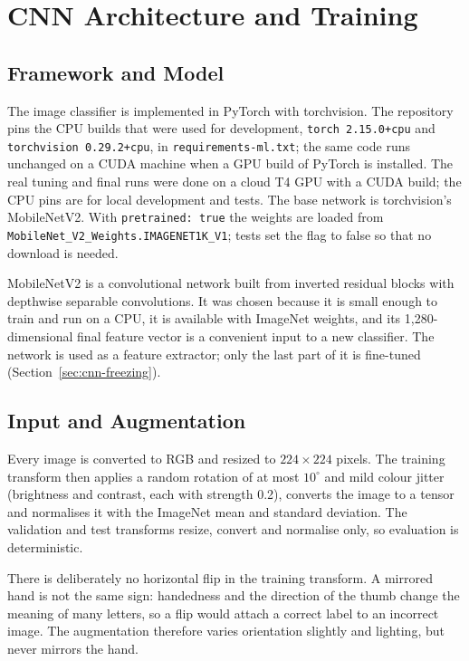 \section{CNN Architecture and Training}
\label{sec:cnn}

\subsection{Framework and Model}

The image classifier is implemented in PyTorch with torchvision. The repository pins the CPU builds that were used for development, \texttt{torch 2.15.0+cpu} and \texttt{torchvision 0.29.2+cpu}, in \texttt{requirements-ml.txt}; the same code runs unchanged on a CUDA machine when a GPU build of PyTorch is installed. The real tuning and final runs were done on a cloud T4 GPU with a CUDA build; the CPU pins are for local development and tests. The base network is torchvision's MobileNetV2. With \texttt{pretrained: true} the weights are loaded from \texttt{MobileNet\_V2\_Weights.IMAGENET1K\_V1}; tests set the flag to false so that no download is needed.

MobileNetV2 is a convolutional network built from inverted residual blocks with depthwise separable convolutions. It was chosen because it is small enough to train and run on a CPU, it is available with ImageNet weights, and its 1{,}280-dimensional final feature vector is a convenient input to a new classifier. The network is used as a feature extractor; only the last part of it is fine-tuned (Section~\ref{sec:cnn-freezing}).

\subsection{Input and Augmentation}

Every image is converted to RGB and resized to $224\times224$ pixels. The training transform then applies a random rotation of at most $10^\circ$ and mild colour jitter (brightness and contrast, each with strength 0.2), converts the image to a tensor and normalises it with the ImageNet mean and standard deviation. The validation and test transforms resize, convert and normalise only, so evaluation is deterministic.

There is deliberately no horizontal flip in the training transform. A mirrored hand is not the same sign: handedness and the direction of the thumb change the meaning of many letters, so a flip would attach a correct label to an incorrect image. The augmentation therefore varies orientation slightly and lighting, but never mirrors the hand.

